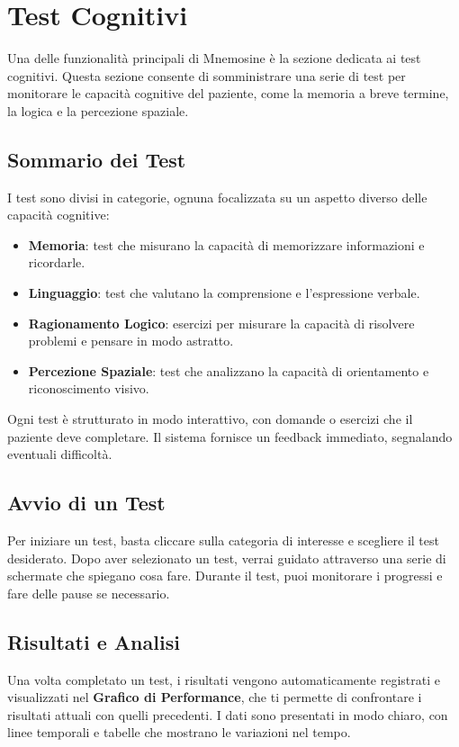 \documentclass[a4paper,12pt]{book}
\begin{document}
	\section{Test Cognitivi}
	Una delle funzionalità principali di Mnemosine è la sezione dedicata ai test cognitivi. Questa sezione consente di somministrare una serie di test per monitorare le capacità cognitive del paziente, come la memoria a breve termine, la logica e la percezione spaziale.
	
	\subsection{Sommario dei Test}
	I test sono divisi in categorie, ognuna focalizzata su un aspetto diverso delle capacità cognitive:
	\begin{itemize}
		\item \textbf{Memoria}: test che misurano la capacità di memorizzare informazioni e ricordarle.
		\item \textbf{Linguaggio}: test che valutano la comprensione e l’espressione verbale.
		\item \textbf{Ragionamento Logico}: esercizi per misurare la capacità di risolvere problemi e pensare in modo astratto.
		\item \textbf{Percezione Spaziale}: test che analizzano la capacità di orientamento e riconoscimento visivo.
	\end{itemize}
	
	Ogni test è strutturato in modo interattivo, con domande o esercizi che il paziente deve completare. Il sistema fornisce un feedback immediato, segnalando eventuali difficoltà.
	
	\subsection{Avvio di un Test}
	Per iniziare un test, basta cliccare sulla categoria di interesse e scegliere il test desiderato. Dopo aver selezionato un test, verrai guidato attraverso una serie di schermate che spiegano cosa fare. Durante il test, puoi monitorare i progressi e fare delle pause se necessario.
	
	\subsection{Risultati e Analisi}
	Una volta completato un test, i risultati vengono automaticamente registrati e visualizzati nel \textbf{Grafico di Performance}, che ti permette di confrontare i risultati attuali con quelli precedenti. I dati sono presentati in modo chiaro, con linee temporali e tabelle che mostrano le variazioni nel tempo.
	
\end{document}
